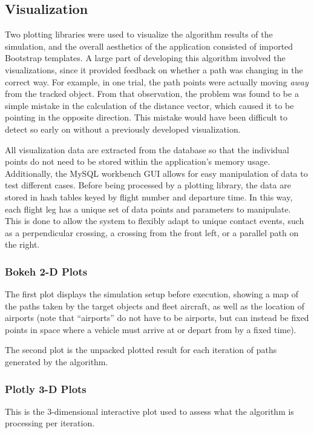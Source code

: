 \documentclass[conf]{new-aiaa}
\begin{document}
\subsection{Visualization}
Two plotting libraries were used to visualize the algorithm results of the simulation, and the overall aesthetics of the application consisted of imported Bootstrap templates. A large part of developing this algorithm involved the visualizations, since it provided feedback on whether a path was changing in the correct way. For example, in one trial, the path points were actually moving \emph{away} from the tracked object. From that observation, the problem was found to be a simple mistake in the calculation of the distance vector, which caused it to be pointing in the opposite direction. This mistake would have been difficult to detect so early on without a previously developed visualization.

All visualization data are extracted from the database so that the individual points do not need to be stored within the application's memory usage. Additionally, the MySQL workbench GUI allows for easy manipulation of data to test different cases. Before being processed by a plotting library, the data are stored in hash tables keyed by flight number and departure time. In this way, each flight leg has a unique set of data points and parameters to manipulate. This is done to allow the system to flexibly adapt to unique contact events, such as a perpendicular crossing, a crossing from the front left, or a parallel path on the right.

\subsubsection{Bokeh 2-D Plots}
The first plot displays the simulation setup before execution, showing a map of the paths taken by the target objects and fleet aircraft, as well as the location of airports (note that ``airports'' do not have to be airports, but can instead be fixed points in space where a vehicle must arrive at or depart from by a fixed time). 

The second plot is the unpacked plotted result for each iteration of paths generated by the algorithm.

\subsubsection{Plotly 3-D Plots}
This is the 3-dimensional interactive plot used to assess what the algorithm is processing per iteration.
\end{document}
